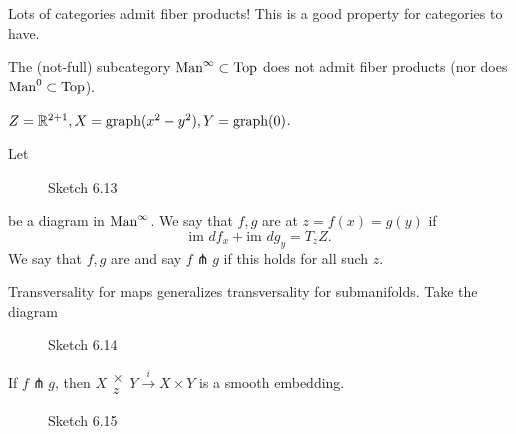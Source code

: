 Lots of categories admit fiber products! This is a good property for categories to have. 

 The (not-full) subcategory \(\text{Man}^\infty\subset\text{Top}\) does not admit 
fiber products (nor does \(\man0\subset\text{Top}\)). 
\begin{example}
    \(Z=\mathbb{R}^{2+1},X=\text{graph}(x^2-y^2),Y=\text{graph(0)}\).
\end{example} 

\begin{definition*}
    Let \begin{figure}[H]\label{fig:6.13}
        \centering
        \caption{Sketch 6.13}
    \end{figure}
    be a diagram in \(\text{Man}^\infty\). We say that \(f,g\) are  at \(z=f(x)=g(y)\) if 
    \[\text{im }df_x+\text{im }dg_y=T_zZ.\]
    We say that \(f,g\) are  and say \(f\pitchfork g\) if this holds 
    for all such \(z\).
\end{definition*}

\begin{remark}
    Transversality for maps generalizes transversality for submanifolds. Take the diagram 
    \begin{figure}[H]\label{fig:6.14}
        \centering
        \caption{Sketch 6.14}
    \end{figure}
\end{remark}

\begin{proposition}\label{prop:6.2}
    If \(f\pitchfork g\), then \(X\substack{\times\\z} Y \stackrel{i}{\to} X\times Y\) is a smooth embedding.
\end{proposition}
\begin{figure}[H]\label{fig:6.15}
    \centering
    \caption{Sketch 6.15}
\end{figure}

